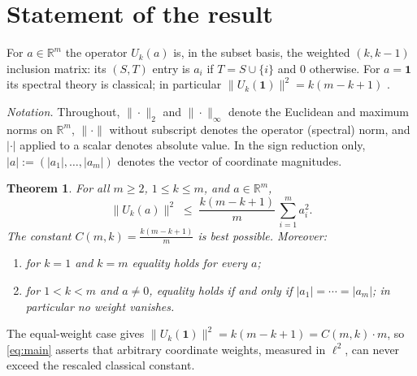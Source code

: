 \documentclass[11pt]{article}
\newtheorem{theorem}{Theorem}
\theoremstyle{remark}
\begin{document}
\section{Statement of the result}

For $a\in\mathbb{R}^m$ the operator $U_k(a)$ is, in the subset basis, the
weighted $(k,k-1)$ inclusion matrix: its $(S,T)$ entry is $a_i$ if
$T=S\cup\{i\}$ and $0$ otherwise. For $a=\mathbf 1$ its spectral theory is
classical; in particular $\|U_k(\mathbf 1)\|^2=k(m-k+1)$
\cite{bannai1984,srinivasan2011}.

\emph{Notation.} Throughout, $\|\cdot\|_2$ and $\|\cdot\|_\infty$
denote the Euclidean and maximum norms on $\mathbb R^m$, $\|\cdot\|$
without subscript denotes the operator (spectral) norm, and $|\cdot|$
applied to a scalar denotes absolute value. In the sign reduction only,
$|a|:=(|a_1|,\dots,|a_m|)$ denotes the vector of coordinate magnitudes.

\begin{theorem}\label{thm:main}
For all $m\ge2$, $1\le k\le m$, and $a\in\mathbb{R}^m$,
\[
\|U_k(a)\|^2\;\le\;\frac{k(m-k+1)}{m}\,\sum_{i=1}^m a_i^2 .
\]
The constant $C(m,k)=\frac{k(m-k+1)}{m}$ is best possible. Moreover:
\begin{enumerate}
\item[(i)] for $k=1$ and $k=m$ equality holds for every $a$;
\item[(ii)] for $1<k<m$ and $a\ne0$, equality holds if and only if
$|a_1|=\cdots=|a_m|$; in particular no weight vanishes.
\end{enumerate}
\end{theorem}

The equal-weight case gives
$\|U_k(\mathbf 1)\|^2=k(m-k+1)=C(m,k)\cdot m$, so
\eqref{eq:main} asserts that arbitrary coordinate weights, measured in
$\ell^2$, can never exceed the rescaled classical constant.
\end{document}
